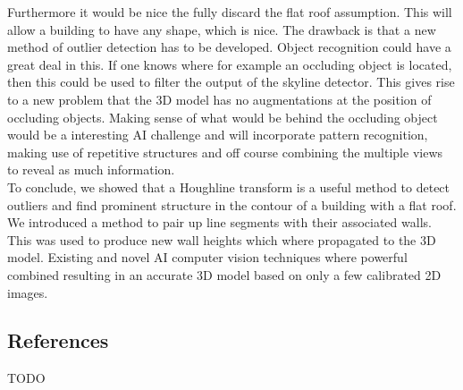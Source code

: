 \documentclass[10pt]{article}
\begin{document}
Furthermore it would be nice the fully discard the flat roof assumption. This will allow a building to have any shape, which is nice. The drawback is that a new method of outlier detection has to be developed. Object recognition could have a great deal in this. If one knows where for example an occluding object is located, then this could be used to filter the output of the skyline detector. This gives rise to a new problem that the 3D model has no augmentations at the position of occluding objects. Making sense of what would be behind the occluding object would be a interesting AI challenge and will incorporate pattern recognition, making use of repetitive structures and off course combining the multiple views to reveal as much information.\\

To conclude, we showed that a Houghline transform is a useful method to detect outliers and find prominent structure in the contour of a building with a flat roof. We introduced a method to pair up line segments with their associated walls. This was used to produce new wall heights which where propagated to the 3D model.
Existing and novel AI computer vision techniques where powerful combined resulting in an accurate 3D model based on only a few calibrated 2D images. 


\subsection{References}
TODO




\end{document}
